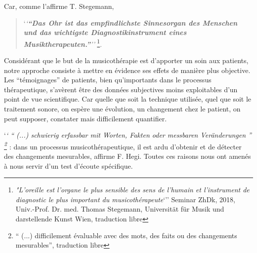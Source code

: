 Car, comme l'affirme T. Stegemann,

\begin{quotation}
	
	`\textit{`\textbf{``Das Ohr ist das empfindlichste
    Sinnesorgan des Menschen und das wichtigste Diagnostikinstrument
    eines Musiktherapeuten.''}''\autocite [44]{seminar_zuerich}}
\footnote{ \textit{"L'oreille est l'organe le plus sensible des sens de l'humain
et l'instrument de diagnostic  le plus important du
musicothérapeute}`'' Seminar  ZhDk, 2018,
Univ.-Prof. Dr. med. Thomas Stegemann, Universität für Musik und darstellende Kunst Wien, traduction libre}.
 \end{quotation}


Considérant que le but de la musicothérapie est d'apporter un soin aux patients,
notre  approche consiste à mettre en évidence ses effets de manière
plus objective. Les ``témoignages'' de patients, bien qu'importants dans le processus thérapeutique,
s'avèrent être des données subjectives moins exploitables d'un
point de vue scientifique. %
Car quelle que soit la technique utilisée, quel que soit
le traitement sonore, on espère une évolution, un changement chez le patient, on peut supposer, constater
 mais
 difficilement quantifier.
 
 `\textit{` \enquote{ (...) schwierig erfassbar mit Worten, Fakten oder messbaren 
 Veränderungen } \footnote { \enquote{ (...) difficilement évaluable avec des mots, des faits ou des 
 changements  
 	mesurables}, traduction libre} \autocite[175]{hegi_improvisation_1993}} : dans un processus 
 	musicothérapeutique, il  
 est ardu d'obtenir et de détecter  des changements mesurables, 
  affirme F. Hegi.
 Toutes ces raisons nous ont amenés à nous servir d'un test d'écoute
 spécifique.%
 
 
 
